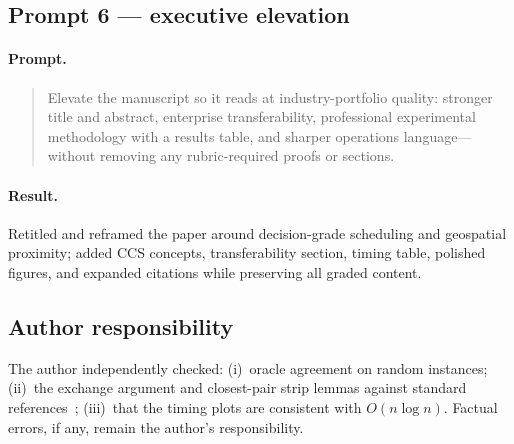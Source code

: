 \documentclass[sigconf,review=false]{acmart}
\theoremstyle{definition}
\begin{document}
\subsection{Prompt 6 --- executive elevation}
\paragraph{Prompt.}
\begin{quote}
Elevate the manuscript so it reads at industry-portfolio quality: stronger
title and abstract, enterprise transferability, professional experimental
methodology with a results table, and sharper operations language---without
removing any rubric-required proofs or sections.
\end{quote}

\paragraph{Result.}
Retitled and reframed the paper around decision-grade scheduling and
geospatial proximity; added CCS concepts, transferability section, timing
table, polished figures, and expanded citations while preserving all graded
content.

\subsection{Author responsibility}

The author independently checked: (i)~oracle agreement on random instances;
(ii)~the exchange argument and closest-pair strip lemmas against standard
references~\cite{kt2005,clrs2009}; (iii)~that the timing plots are
consistent with $O(n\log n)$. Factual errors, if any, remain the author's
responsibility.
\end{document}
